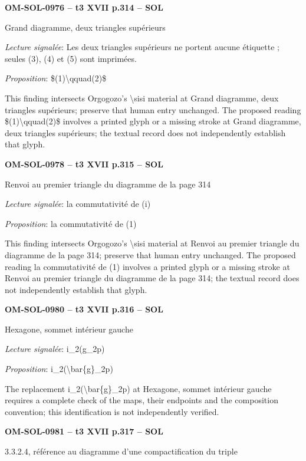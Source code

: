 \par\noindent\textbf{OM-SOL-0976 -- t3 XVII p.314 -- SOL}\par
Grand diagramme, deux triangles supérieurs\par
\emph{Lecture signalée}: Les deux triangles supérieurs ne portent aucune étiquette ; seules (3), (4) et (5) sont imprimées.\par
\emph{Proposition}: \$(1)\textbackslash{}qquad(2)\$\par
This finding intersects Orgogozo's \textbackslash{}sisi material at Grand diagramme, deux triangles supérieurs; preserve that human entry unchanged. The proposed reading \$(1)\textbackslash{}qquad(2)\$ involves a printed glyph or a missing stroke at Grand diagramme, deux triangles supérieurs; the textual record does not independently establish that glyph.\par
\par\noindent\textbf{OM-SOL-0978 -- t3 XVII p.315 -- SOL}\par
Renvoi au premier triangle du diagramme de la page 314\par
\emph{Lecture signalée}: la commutativité de (i)\par
\emph{Proposition}: la commutativité de (1)\par
This finding intersects Orgogozo's \textbackslash{}sisi material at Renvoi au premier triangle du diagramme de la page 314; preserve that human entry unchanged. The proposed reading la commutativité de (1) involves a printed glyph or a missing stroke at Renvoi au premier triangle du diagramme de la page 314; the textual record does not independently establish that glyph.\par
\par\noindent\textbf{OM-SOL-0980 -- t3 XVII p.316 -- SOL}\par
Hexagone, sommet intérieur gauche\par
\emph{Lecture signalée}: i\_2(g\_2p)\par
\emph{Proposition}: i\_2(\textbackslash{}bar\{g\}\_2p)\par
The replacement i\_2(\textbackslash{}bar\{g\}\_2p) at Hexagone, sommet intérieur gauche requires a complete check of the maps, their endpoints and the composition convention; this identification is not independently verified.\par
\par\noindent\textbf{OM-SOL-0981 -- t3 XVII p.317 -- SOL}\par
3.3.2.4, référence au diagramme d'une compactification du triple\par
